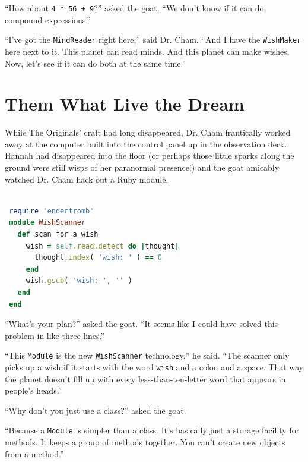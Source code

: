 \documentclass[10pt,twoside]{report}
\begin{document}
``How about \lstinline[breaklines=true]|4 * 56 + 9|?'' asked the goat.
``We don't know if it can do compound expressions.''

``I've got the \lstinline[breaklines=true]|MindReader| right here,''
said Dr. Cham.  ``And I have the
\lstinline[breaklines=true]|WishMaker| here next to it. This planet
can read minds.  And this planet can make wishes.  Now, let's see if
it can do both at the same time.''


\section{Them What Live the Dream}


While The Originals' craft had long disappeared, Dr. Cham frantically
worked away at the computer built into the control panel up in the
observation deck.  Hannah had disappeared into the floor (or perhaps
those little sparks along the ground were still wisps of her
paranormal presence!) and the goat amicably watched Dr. Cham hack out
a Ruby module.


\begin{lstlisting}[basicstyle=\ttfamily\color{basiccolor},
    commentstyle = \ttfamily\color{commentcolor},
    keywordstyle=\ttfamily\color{keywordscolor},
    stringstyle=\color{stringcolor},
    language=Ruby,
    basicstyle=\small\ttfamily,
    showstringspaces=false,
  ]

 require 'endertromb'
 module WishScanner
   def scan_for_a_wish
     wish = self.read.detect do |thought|
       thought.index( 'wish: ' ) == 0
     end
     wish.gsub( 'wish: ', '' )
   end
 end

\end{lstlisting}


``What's your plan?'' asked the goat.  ``It seems like I could have
solved this problem in like three lines.''

``This \lstinline[breaklines=true]|Module| is the new
\lstinline[breaklines=true]|WishScanner| technology,'' he said.  ``The
scanner only picks up a wish if it starts with the word
\lstinline[breaklines=true]|wish| and a colon and a space.  That way
the planet doesn't fill up with every less-than-ten-letter word that
appears in people's heads.''

``Why don't you just use a class?'' asked the goat.

``Because a \lstinline[breaklines=true]|Module| is simpler than a
class.  It's basically just a storage facility for methods.  It keeps
a group of methods together.  You can't create new objects from a
method.''
\end{document}
